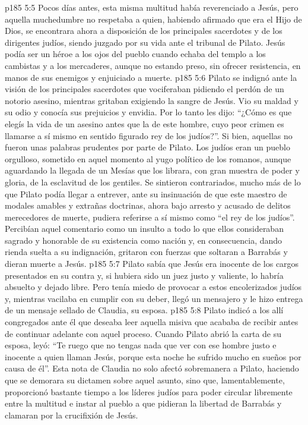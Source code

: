 \vs p185 5:5 Pocos días antes, esta misma multitud había reverenciado a Jesús, pero aquella muchedumbre no respetaba a quien, habiendo afirmado que era el Hijo de Dios, se encontrara ahora a disposición de los principales sacerdotes y de los dirigentes judíos, siendo juzgado por su vida ante el tribunal de Pilato. Jesús podía ser un héroe a los ojos del pueblo cuando echaba del templo a los cambistas y a los mercaderes, aunque no estando preso, sin ofrecer resistencia, en manos de sus enemigos y enjuiciado a muerte.
\vs p185 5:6 Pilato se indignó ante la visión de los principales sacerdotes que vociferaban pidiendo el perdón de un notorio asesino, mientras gritaban exigiendo la sangre de Jesús. Vio su maldad y su odio y conocía sus prejuicios y envidia. Por lo tanto les dijo: “¿Cómo es que elegís la vida de un asesino antes que la de este hombre, cuyo peor crimen es llamarse a sí mismo en sentido figurado rey de los judíos?”. Si bien, aquellas no fueron unas palabras prudentes por parte de Pilato. Los judíos eran un pueblo orgulloso, sometido en aquel momento al yugo político de los romanos, aunque aguardando la llegada de un Mesías que los librara, con gran muestra de poder y gloria, de la esclavitud de los gentiles. Se sintieron contrariados, mucho más de lo que Pilato podía llegar a entrever, ante su insinuación de que este maestro de modales amables y extrañas doctrinas, ahora bajo arresto y acusado de delitos merecedores de muerte, pudiera referirse a sí mismo como “el rey de los judíos”. Percibían aquel comentario como un insulto a todo lo que ellos consideraban sagrado y honorable de su existencia como nación y, en consecuencia, dando rienda suelta a su indignación, gritaron con fuerzas que soltaran a Barrabás y dieran muerte a Jesús.
\vs p185 5:7 Pilato sabía que Jesús era inocente de los cargos presentados en su contra y, si hubiera sido un juez justo y valiente, lo habría absuelto y dejado libre. Pero tenía miedo de provocar a estos encolerizados judíos y, mientras vacilaba en cumplir con su deber, llegó un mensajero y le hizo entrega de un mensaje sellado de Claudia, su esposa.
\vs p185 5:8 Pilato indicó a los allí congregados ante él que deseaba leer aquella misiva que acababa de recibir antes de continuar adelante con aquel proceso. Cuando Pilato abrió la carta de su esposa, leyó: “Te ruego que no tengas nada que ver con ese hombre justo e inocente a quien llaman Jesús, porque esta noche he sufrido mucho en sueños por causa de él”. Esta nota de Claudia no solo afectó sobremanera a Pilato, haciendo que se demorara su dictamen sobre aquel asunto, sino que, lamentablemente, proporcionó bastante tiempo a los líderes judíos para poder circular libremente entre la multitud e instar al pueblo a que pidieran la libertad de Barrabás y clamaran por la crucifixión de Jesús.
